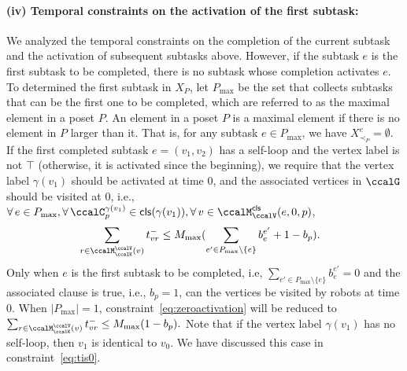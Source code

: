 \documentclass[Afour,sageh,times]{sagej}
\newcommand{\clause}[1]{\mathsf{cls}(#1)}
\begin{document}
{{{{\paragraph{(iv) Temporal constraints on the activation of the first subtask:}
We analyzed the temporal constraints on the completion of the current subtask and the activation of subsequent subtasks above. However, if the subtask $e$ is the first subtask to be completed, there is no subtask whose completion activates $e$. To determined the first subtask in $X_P$,  let $P_{\text{max}}$ be the set that collects subtasks that can be the first one to be completed, which are referred to as the maximal element in a poset $P$. An element in a poset $P$ is a maximal element if there is no element in $P$ larger than it. That is, for  any subtask  $e \in P_{\text{max}}$, we have $X_{\prec_P}^e = \emptyset$. If the first completed subtask $e = (v_1 ,v_2)$ has a self-loop and the vertex label is not $\top$ (otherwise, it is activated since the beginning), we require that the vertex label $\gamma(v_1)$ should be activated at time 0, and the associated vertices in $\ccalG$ should be visited at 0,   i.e., $\forall\, e \in P_{\text{max}}, \forall\, \ccalC_p^{\gamma(v_1)} \in \clause{\gamma(v_1)}, \forall \,v \in \ccalM^\mathsf{cls}_\ccalV(e,0,p)$,
\begingroup\makeatletter\def\f@size{10}\check@mathfonts
\def\maketag@@@#1{\hbox{\m@th\normalsize\normalfont#1}}%
\begin{align}\label{eq:zeroactivation}
  & \sum_{r\in \ccalM^\ccalV_{\ccalK}(v)} t_{vr}^-  \leq M_{\text{max}} (\sum_{e' \in P_{\text{max}}\setminus \{e\}  } {b}_{e}^{e'} + 1- b_p).
\end{align}
\endgroup
Only when $e$ is the first subtask to be completed, i.e, $\sum_{e' \in P_{\text{max}}\setminus \{e\}  } {b}_{e}^{e'}=0$ and the associated clause is true, i.e., $b_p=1$, can the vertices be visited by robots at time 0. When $|P_{\text{max}}|=1$, constraint~\eqref{eq:zeroactivation} will be reduced to  $ \sum_{r\in \ccalM^\ccalV_{\ccalK}(v)} t_{vr}^-  \leq M_{\text{max}} (1- b_p).$ Note that if the vertex label $\gamma(v_1)$ has no self-loop, then $v_1$ is identical to $v_0$. We have discussed  this case in constraint~\eqref{eq:tis0}.


}}}}
\end{document}
